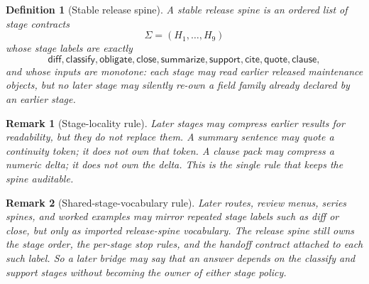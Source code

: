 \documentclass[11pt]{article}
\newtheorem{definition}{Definition}
\newtheorem{remark}{Remark}
\begin{document}
\begin{definition}[Stable release spine]
A \emph{stable release spine} is an ordered list of stage contracts
\[
\Sigma=(H_1,\dots,H_9)
\]
whose stage labels are exactly
\[
\textsf{diff},\textsf{classify},\textsf{obligate},\textsf{close},\textsf{summarize},\textsf{support},\textsf{cite},\textsf{quote},\textsf{clause},
\]
and whose inputs are monotone: each stage may read earlier released maintenance objects, but no later stage may silently re-own a field family already declared by an earlier stage.
\end{definition}

\begin{remark}[Stage-locality rule]
Later stages may compress earlier results for readability, but they do not replace them.
A summary sentence may quote a continuity token; it does not own that token.
A clause pack may compress a numeric delta; it does not own the delta.
This is the single rule that keeps the spine auditable.
\end{remark}

\begin{remark}[Shared-stage-vocabulary rule]
Later routes, review menus, series spines, and worked examples may mirror repeated stage labels such as \textsf{diff} or \textsf{close}, but only as imported release-spine vocabulary.
The release spine still owns the stage order, the per-stage stop rules, and the handoff contract attached to each such label.
So a later bridge may say that an answer depends on the \textsf{classify} and \textsf{support} stages without becoming the owner of either stage policy.
\end{remark}
\end{document}
